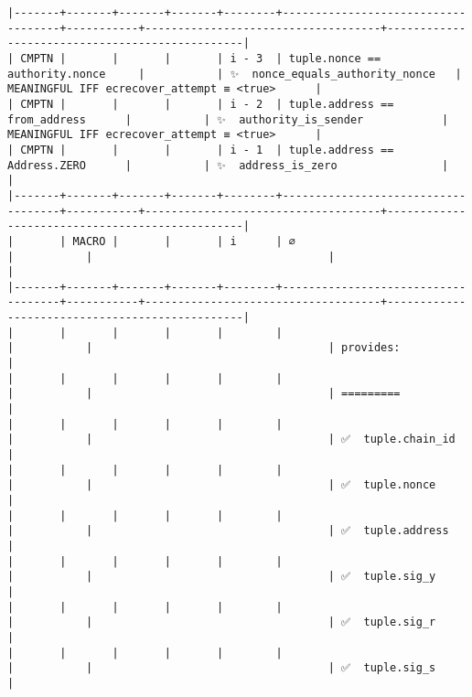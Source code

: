 \documentclass[varwidth=\maxdimen,margin=0.5cm,multi={verbatim}]{standalone}
\begin{document}
\begin{verbatim}
|-------+-------+-------+-------+--------+------------------------------------+-----------+------------------------------------+------------------------------------------------|
| CMPTN |       |       |       | i - 3  | tuple.nonce == authority.nonce     |           | ✨  nonce_equals_authority_nonce   | MEANINGFUL IFF ecrecover_attempt ≡ <true>      |
| CMPTN |       |       |       | i - 2  | tuple.address == from_address      |           | ✨  authority_is_sender            | MEANINGFUL IFF ecrecover_attempt ≡ <true>      |
| CMPTN |       |       |       | i - 1  | tuple.address == Address.ZERO      |           | ✨  address_is_zero                |                                                |
|-------+-------+-------+-------+--------+------------------------------------+-----------+------------------------------------+------------------------------------------------|
|       | MACRO |       |       | i      | ∅                                  |           |                                    |                                                |
|-------+-------+-------+-------+--------+------------------------------------+-----------+------------------------------------+------------------------------------------------|
|       |       |       |       |        |                                    |           |                                    | provides:                                      |
|       |       |       |       |        |                                    |           |                                    | =========                                      |
|       |       |       |       |        |                                    |           |                                    | ✅  tuple.chain_id                             |
|       |       |       |       |        |                                    |           |                                    | ✅  tuple.nonce                                |
|       |       |       |       |        |                                    |           |                                    | ✅  tuple.address                              |
|       |       |       |       |        |                                    |           |                                    | ✅  tuple.sig_y                                |
|       |       |       |       |        |                                    |           |                                    | ✅  tuple.sig_r                                |
|       |       |       |       |        |                                    |           |                                    | ✅  tuple.sig_s                                |

\end{verbatim}
\end{document}
